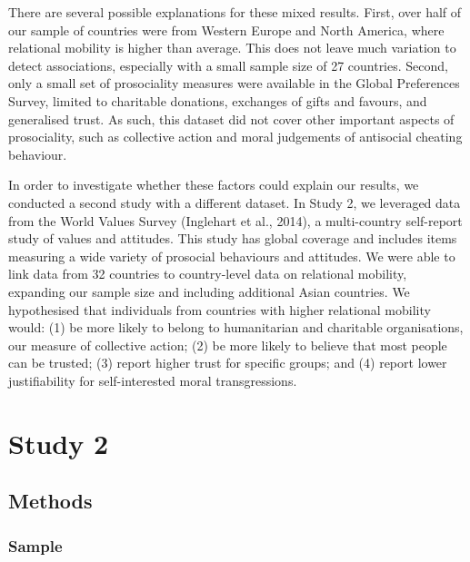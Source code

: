 \documentclass[english,man,floatsintext]{apa6}
\begin{document}
There are several possible explanations for these mixed results. First, over half of our sample of countries were from Western Europe and North America, where relational mobility is higher than average. This does not leave much variation to detect associations, especially with a small sample size of 27 countries. Second, only a small set of prosociality measures were available in the Global Preferences Survey, limited to charitable donations, exchanges of gifts and favours, and generalised trust. As such, this dataset did not cover other important aspects of prosociality, such as collective action and moral judgements of antisocial cheating behaviour.

In order to investigate whether these factors could explain our results, we conducted a second study with a different dataset. In Study 2, we leveraged data from the World Values Survey (Inglehart et al., 2014), a multi-country self-report study of values and attitudes. This study has global coverage and includes items measuring a wide variety of prosocial behaviours and attitudes. We were able to link data from 32 countries to country-level data on relational mobility, expanding our sample size and including additional Asian countries. We hypothesised that individuals from countries with higher relational mobility would: (1) be more likely to belong to humanitarian and charitable organisations, our measure of collective action; (2) be more likely to believe that most people can be trusted; (3) report higher trust for specific groups; and (4) report lower justifiability for self-interested moral transgressions.

\hypertarget{study-2}{%
\section{Study 2}\label{study-2}}

\hypertarget{methods-1}{%
\subsection{Methods}\label{methods-1}}

\hypertarget{sample-1}{%
\subsubsection{Sample}\label{sample-1}}
\end{document}
